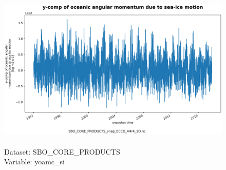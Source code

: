 \begin{figure}[H]
\centering
\includegraphics[scale=0.5]{../images/plots/oneD_plots/SBO_Core_Products/yoamc_si.png}
\caption{\\Dataset: SBO\_CORE\_PRODUCTS\\Variable: yoamc\_si}
\label{tab:table-SBO_CORE_PRODUCTS_yoamc_si-Plot}
\end{figure}
\pagebreak
